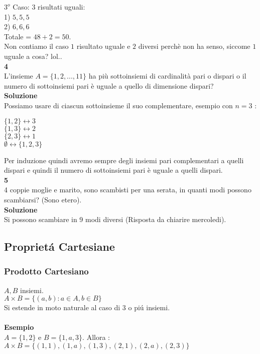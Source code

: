 \documentclass[11pt]{article}
\begin{document}
            $3^o$ Caso: $3$ risultati uguali:\\
            1) $5,5,5$\\
            2) $6,6,6$\\
            Totale = $48 + 2 = 50$.\\
            Non contiamo il caso $1$ risultato uguale e $2$ diversi perchè non ha senso, siccome $1$ uguale a cosa? lol..\\
            \textbf{\large 4}\\
            L'insieme $A = \{1,2,...,11\}$ ha più sottoinsiemi di cardinalit\`a pari o dispari o il numero di sottoinsiemi pari è uguale a quello di dimensione dispari?\\
            \textbf{\large Soluzione}\\
            Possiamo usare di ciascun sottoinsieme il suo complementare, esempio con $n = 3$ :
            \begin{center}
           		$\{1,2\} \longleftrightarrow 3$\\
            	$\{1,3\} \longleftrightarrow 2$\\
            	$\{2,3\} \longleftrightarrow 1$\\
            	$\emptyset \longleftrightarrow \{1,2,3\}$\\
            \end{center}
            Per induzione quindi avremo sempre degli insiemi pari complementari a quelli dispari e quindi il numero di sottoinsiemi pari è uguale a quelli dispari.\\
            \textbf{\large 5}\\
            4 coppie moglie e marito, sono scambisti per una serata, in quanti modi possono scambiarsi? (Sono etero).\\
            \textbf{\large Soluzione}\\
            Si possono scambiare in 9 modi diversi (Risposta da chiarire mercoledi).
            \\
            \subsection{Propriet\'a Cartesiane}
            \subsubsection{Prodotto Cartesiano}
            $A,B$ insiemi.\\
            $A \times B = \{(a,b) : a \in A, b \in B\}$\\
            Si estende in moto naturale al caso di $3$ o pi\'u insiemi.\\
            \\
            \textbf{\large Esempio}\\
            $A = \{1,2\}$ e $B = \{1,a,3\}$. Allora :
            $A \times B = \{(1,1), (1,a), (1,3), (2,1),(2,a),(2,3)\}$\\
\end{document}
